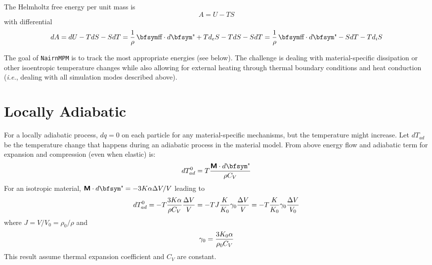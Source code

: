 \documentclass[11pt]{book}
\newcommand{\tens}[1]{\boldsymbol{\mathsf{#1}}}
\begin{document}
The Helmholtz free energy per unit mass is
\begin{equation}%
     A = U - TS
\end{equation}%
with differential
\begin{equation}%
    dA = dU - TdS - SdT = {1\over \rho}\thinspace \st\cdot d\et + T d_eS - TdS - SdT
              = {1\over \rho}\thinspace \st\cdot d\et  - SdT - T d_iS
\end{equation}%

The goal of {\tt NairnMPM} is to track the most appropriate energies (see below). The challenge is dealing with material-specific dissipation or other isoentropic temperature changes while also allowing for external heating through thermal boundary conditions and heat conduction ({\em i.e.}, dealing with all simulation modes described above).

\section{Locally Adiabatic}

For a locally adiabatic process, $dq=0$ on each particle for any material-specific mechanisms, but the temperature might increase. Let $dT_{ad}$ be the temperature change that happens during an adiabatic process in the material model. From above energy flow and adiabatic term for expansion and compression (even when elastic) is:
\begin{equation}
    dT_{ad}^0 = T {\tens{M}\cdot d\et\over \rho C_V}
\end{equation}
For an isotropic material, $\tens{M}\cdot d\et = - 3K\alpha \Delta V/V$ leading to
\begin{equation}
    dT_{ad}^0 = -T {3K\alpha\over \rho C_V}{\Delta V\over V} = -T J {K\over K_0} \gamma_0 {\Delta V\over V} = -T {K\over K_0} \gamma_0 {\Delta V\over V_0}
\end{equation}
where $J = V/V_0 = \rho_0/ \rho$ and
\begin{equation}
    \gamma_0 = {3K_0\alpha\over \rho_0 C_V}      \label{gamzdef}
\end{equation}
This result assume thermal expansion coefficient and $C_V$ are constant.
\end{document}

